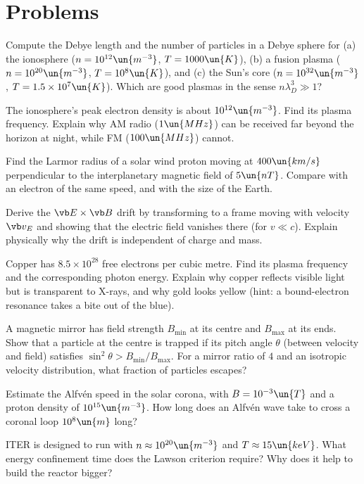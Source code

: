 \section{Problems}

\begin{problems}
\core Compute the Debye length and the number of particles in a Debye sphere for (a) the ionosphere ($n = 10^{12}\un{m^{-3}}$, $T = 1000\un{K}$), (b) a fusion plasma ($n = 10^{20}\un{m^{-3}}$, $T = 10^8\un{K}$), and (c) the Sun's core ($n = 10^{32}\un{m^{-3}}$, $T = 1.5\times10^7\un{K}$). Which are good plasmas in the sense $n\lambda_D^3\gg1$?

\core The ionosphere's peak electron density is about $10^{12}\un{m^{-3}}$. Find its plasma frequency. Explain why AM radio ($1\un{MHz}$) can be received far beyond the horizon at night, while FM ($100\un{MHz}$) cannot.

 Find the Larmor radius of a solar wind proton moving at $400\un{km/s}$ perpendicular to the interplanetary magnetic field of $5\un{nT}$. Compare with an electron of the same speed, and with the size of the Earth.

\core Derive the $\vb E\times\vb B$ drift by transforming to a frame moving with velocity $\vb v_E$ and showing that the electric field vanishes there (for $v\ll c$). Explain physically why the drift is independent of charge and mass.

 Copper has $8.5\times10^{28}$ free electrons per cubic metre. Find its plasma frequency and the corresponding photon energy. Explain why copper reflects visible light but is transparent to X-rays, and why gold looks yellow (hint: a bound-electron resonance takes a bite out of the blue).

 A magnetic mirror has field strength $B_{\min}$ at its centre and $B_{\max}$ at its ends. Show that a particle at the centre is trapped if its pitch angle $\theta$ (between velocity and field) satisfies $\sin^2\theta > B_{\min}/B_{\max}$. For a mirror ratio of $4$ and an isotropic velocity distribution, what fraction of particles escapes?

 Estimate the Alfv\'en speed in the solar corona, with $B = 10^{-3}\un{T}$ and a proton density of $10^{15}\un{m^{-3}}$. How long does an Alfv\'en wave take to cross a coronal loop $10^{8}\un{m}$ long?

\core ITER is designed to run with $n\approx10^{20}\un{m^{-3}}$ and $T\approx15\un{keV}$. What energy confinement time does the Lawson criterion require? Why does it help to build the reactor bigger?


\end{problems}
